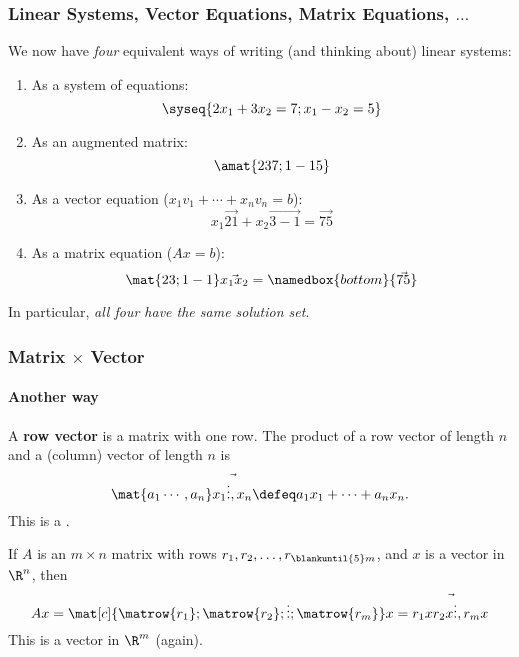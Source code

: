 \begin{frame}
\frametitle{Linear Systems, Vector Equations, Matrix Equations, $\ldots$}

We now have \emph{four} equivalent ways of writing (and thinking about) linear
systems:
\pause
\begin{enumerate}
\item As a system of equations:
\[ \syseq{2x_1 + 3x_2 = 7; x_1 - x_2 = 5} \]
\vskip-5mm\pause
\item As an augmented matrix:
  \vskip -3mm
  \[ \amat{ 2 3 7; 1 -1 5} \]
\vskip-5mm\pause
\item As a vector equation ($x_1v_1 + \cdots + x_nv_n = b$):
  \[ x_1\vec{2 1} + x_2\vec{3 -1} = \vec{7 5} \]
\vskip-7mm\pause
\item As a matrix equation ($Ax = b$):
  \[ \mat{ 2 3; 1 -1}\vec{x_1 x_2} = \namedbox{bottom}{\vec{7 5}} \]
\end{enumerate}
\pause

In particular, \emph{all four have the same solution set}.
\pause
{}

\end{frame}



\begin{frame}
\frametitle{Matrix $\times$ Vector}
\framesubtitle{Another way}

\vskip-3mm
\begin{defn}
  A \textbf{row vector} is a matrix with one row.
  \pause
  The product of a row vector of length $n$ and a (column) vector of length $n$
  is
  \[ \mat{ a_1 \cdots, a_n} \vec{x_1 \vdots, x_n}
  \defeq a_1x_1 + \cdots + a_nx_n. \]
  This is a .
\end{defn}

\pause[4]\medskip
If $A$ is an $m\times n$ matrix with rows $r_1,r_2,\ldots,r_{\blankuntil{5}m}$,
\pause
and $x$ is a vector in $\R^n$, then
\[ Ax = 
\mat[c]{ \matrow{r_1};
     \matrow{r_2};
     \vdots ;
     \matrow{r_m}}
     x
= \vec{r_1x r_2x \vdots, r_mx}
 \]
This is \pause a vector in $\R^m$ (again).

\end{frame}


